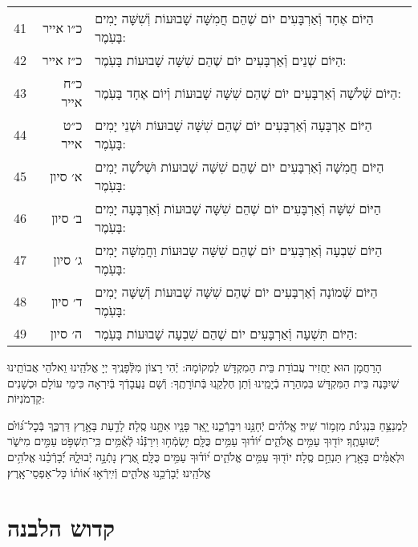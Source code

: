 \documentclass[twoside, openany, parskip=half, 11pt]{book}
\begin{document}
\begin{scriptsize}
\begin{longtable}{ l | r | p{} }
		41 & כ״ו אייר & הַיּוֹם אֶחָד וְֿאַרְבָּעִים יוֹם שֶׁהֵם חֲמִשָּׁה שָׁבוּעוֹת וְֿשִׁשָּׁה יָמִים בָּעֹֽמֶר: \\
		42 & כ״ז אייר & הַיּוֹם שְׁנֵים וְֿאַרְבָּעִים יוֹם שֶׁהֵם שִׁשָּׁה שָׁבוּעוֹת בָּעֹֽמֶר: \\
		43 & כ״ח אייר & הַיּוֹם שְֿׁלֹשָׁה וְֿאַרְבָּעִים יוֹם שֶׁהֵם שִׁשָּׁה שָׁבוּעוֹת וְֿיוֹם אֶחָד בָּעֹֽמֶר: \\
		44 & כ״ט אייר & הַיּוֹם אַרְבָּעָה וְֿאַרְבָּעִים יוֹם שֶׁהֵם שִׁשָּׁה שָׁבוּעוֹת וּשְׁנֵי יָמִים בָּעֹֽמֶר: \\
		45 & א׳ סיון & הַיּוֹם חֲמִשָּׁה וְֿאַרְבָּעִים יוֹם שֶׁהֵם שִׁשָּׁה שָׁבוּעוֹת וּשְׁלֹשָׁה יָמִים בָּעֹֽמֶר: \\
		46 & ב׳ סיון & הַיּוֹם שִׁשָּׁה וְֿאַרְבָּעִים יוֹם שֶׁהֵם שִׁשָּׁה שָׁבוּעוֹת וְֿאַרְבָּעָה יָמִים בָּעֹֽמֶר: \\
		47 & ג׳ סיון & הַיּוֹם שִׁבְעָה וְֿאַרְבָּעִים יוֹם שֶׁהֵם שִׁשָּׁה שָבוּעוֹת וַחֲמִשָּׁה יָמִים בָּעֹֽמֶר: \\
		48 & ד׳ סיון & הַיּוֹם שְֿׁמוֹנָה וְֿאַרְבָּעִים יוֹם שֶׁהֵם שִׁשָּׁה שָׁבוּעוֹת וְֿשִׁשָּׁה יָמִים בָּעֹֽמֶר: \\
		49 & ה׳ סיון & הַיּוֹם תִּשְׁעָה וְֿאַרְבָּעִים יוֹם שֶׁהֵם שִׁבְעָה שָׁבוּעוֹת בָּעֹֽמֶר:
	\end{longtable}
\end{scriptsize}



הָרַחֲמָן הוּא יַחֲזִיר עֲבוֹדַת בֵּית הַמִקְדָּשׁ לִמְקוֹמָהּ:
יְֿהִי רָצוֹן מִלְּֿפָנֶֽיךָ יְיָ אֱלֹהֵֽינוּ וֵאלֹהֵי אֲבוֹתֵֽינוּ שֶׁיִבָּנֶה בֵּית הַמִּקְדָּשׁ בִּמְהֵרָה בְֿיָמֵֽינוּ וְֿתֵן חֶלְקֵֽנוּ בְּֿתוֹרָתֶֽךָ: וְֿשָׁם נַעֲבָדְֿךָ בְּֿיִרְאָה כִּימֵי עוֹלָם וּכְשָׁנִים קַדְמֹנִיּוֹת:


לַמְנַצֵּ֥חַ בִּנְגִינֹ֗ת מִזְמ֥וֹר שִֽׁיר׃ אֱֽלֹהִ֗ים יְֿחָנֵּ֥נוּ וִיבָרְֿכֵ֑נוּ יָ֤אֵֽר פָּנָ֖יו אִתָּ֣נוּ סֶֽלָה׃ לָדַ֣עַת בָּאָ֣רֶץ דַּרְכֶּ֑ךָ בְּֿכׇל־גּ֝וֹיִ֗ם יְֿשׁוּעָתֶֽךָ׃ יוֹד֖וּךָ עַמִּ֥ים אֱלֹהִ֑ים י֝וֹד֗וּךָ עַמִּ֥ים כֻּלָּֽם׃ יִ֥שְׂמְֿח֥וּ וִירַנְּֿֿנ֗וּ לְֿאֻ֫מִּ֥ים כִּֽי־תִשְׁפֹּ֣ט עַמִּ֣ים מִישֹׁ֑ר וּלְאֻמִּ֓ים בָּאָ֖רֶץ תַּנְחֵ֣ם סֶֽלָה׃ יוֹד֖וּךָ עַמִּ֥ים אֱלֹהִ֑ים י֝וֹד֗וּךָ עַמִּ֥ים כֻּלָּֽם׃ אֶ֭רֶץ נָתְֿנָ֣ה יְֿבוּלָ֑הּ יְֿ֝בָרְֿכֵ֗נוּ אֱלֹהִ֥ים
אֱלֹהֵֽינוּ׃ יְֿבָרְֿכֵ֥נוּ אֱלֹהִ֑ים וְֿיִֽירְֿא֥וּ א֝וֹת֗וֹ כָּל־אַפְסֵי־אָֽרֶץ׃

\section[קדוש הלבנה]{ קדוש הלבנה }
\end{document}
